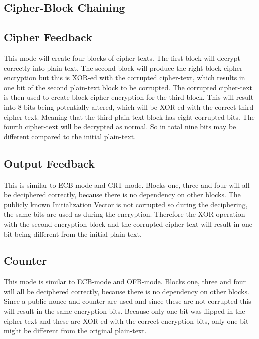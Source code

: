 \documentclass{article}
\begin{document}
\subsection{Cipher-Block Chaining}
\subsection{Cipher Feedback}
This mode will create four blocks of cipher-texts. The first block will decrypt correctly into plain-text. The second block will produce the right block cipher encryption but this is XOR-ed with the corrupted cipher-text, which results in one bit of the second plain-text block to be corrupted. The corrupted cipher-text is then used to create block cipher encryption for the third block. This will result into 8-bits being potentially altered, which will be XOR-ed with the correct third cipher-text. Meaning that the third plain-text block has eight corrupted bits. The fourth cipher-text will be decrypted as normal. So in total nine bits may be different compared to the initial plain-text.

\subsection{Output Feedback}
This is similar to ECB-mode and CRT-mode. Blocks one, three and four will all be deciphered correctly, because there is no dependency on other blocks. The publicly known Initialization Vector is not corrupted so during the deciphering, the same bits are used as during the encryption. Therefore the XOR-operation with the second encryption block and the corrupted cipher-text will result in one bit being different from the initial plain-text.

\subsection{Counter}
This mode is similar to ECB-mode and OFB-mode. Blocks one, three and four will all be deciphered correctly, because there is no dependency on other blocks. Since a public nonce and counter are used and since these are not corrupted this will result in the same encryption bits. Because only one bit was flipped in the cipher-text and these are XOR-ed with the correct encryption bits, only one bit might be different from the original plain-text.


%
% 
\end{document}
